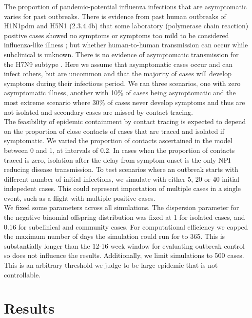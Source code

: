 \documentclass{article}
\begin{document}
The proportion of pandemic-potential influenza infections that are asymptomatic varies for past outbreaks. There is evidence from past human outbreaks of H1N1pdm and H5N1 (2.3.4.4b) that some laboratory (polymerase chain reaction) positive cases showed no symptoms or symptoms too mild to be considered influenza-like illness \citep{lesslerOutbreak2009Pandemic2009, gargHighlyPathogenicAvian2025}; but whether human-to-human transmission can occur while subclinical is unknown. There is no evidence of asymptomatic transmission for the H7N9 subtype \citep{xuSerologicalInvestigationSubclinical2013}. Here we assume that asymptomatic cases occur and can infect others, but are uncommon and that the majority of cases will develop symptoms during their infectious period.  We ran three scenarios, one with zero asymptomatic illness, another with 10\% of cases being asymptomatic and the most extreme scenario where 30\% of cases never develop symptoms and thus are not isolated and secondary cases are missed by contact tracing. \\

The feasibility of epidemic containment by contact tracing is expected to depend on the proportion of close contacts of cases that are traced and isolated if symptomatic. We varied the proportion of contacts ascertained in the model between 0 and 1, at intervals of 0.2. In cases when the proportion of contacts traced is zero, isolation after the delay from symptom onset is the only NPI reducing disease transmission. To test scenarios where an outbreak starts with different number of initial infections, we simulate with either 5, 20 or 40 initial indepedent cases. This could represent importation of multiple cases in a single event, such as a flight with multiple positive cases. \\

We fixed some parameters across all simulations. The dispersion parameter for the negative binomial offspring distribution was fixed at 1 for isolated cases, and 0.16 for subclinical and community cases. For computational efficiency we capped the maximum number of days the simulation could run for to 365. This is substantially longer than the 12-16 week window for evaluating outbreak control so does not influence the results. Additionally, we limit simulations to 500 cases. This is an arbitrary threshold we judge to be large epidemic that is not controllable.

\section*{Results}
\end{document}
